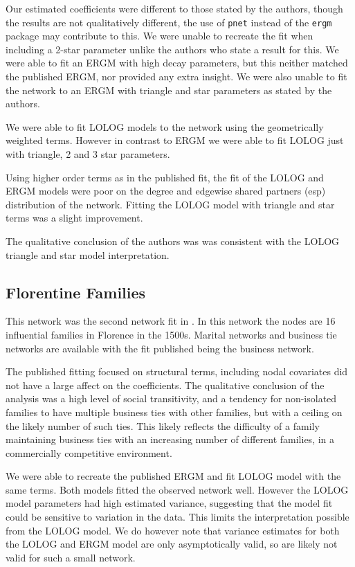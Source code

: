 \documentclass[
]{statsoc}
\begin{document}
Our estimated coefficients were different to those stated by the
authors, though the results are not qualitatively different, the use of
\texttt{pnet} instead of the \texttt{ergm} package may contribute to
this. We were unable to recreate the fit when including a 2-star
parameter unlike the authors who state a result for this. We were able
to fit an ERGM with high decay parameters, but this neither matched the
published ERGM, nor provided any extra insight. We were also unable to
fit the network to an ERGM with triangle and star parameters as stated
by the authors.

We were able to fit LOLOG models to the network using the geometrically
weighted terms. However in contrast to ERGM we were able to fit LOLOG
just with triangle, 2 and 3 star parameters.

Using higher order terms as in the published fit, the fit of the LOLOG
and ERGM models were poor on the degree and edgewise shared partners
(esp) distribution of the network. Fitting the LOLOG model with triangle
and star terms was a slight improvement.

The qualitative conclusion of the authors was was consistent with the
LOLOG triangle and star model interpretation.

\subsection{Florentine Families}

This network was the second network fit in \cite{Robins2007}. In this
network the nodes are 16 influential families in Florence in the 1500s.
Marital networks and business tie networks are available with the fit
published being the business network.

The published fitting focused on structural terms, including nodal
covariates did not have a large affect on the coefficients. The
qualitative conclusion of the analysis was a high level of social
transitivity, and a tendency for non-isolated families to have multiple
business ties with other families, but with a ceiling on the likely
number of such ties. This likely reflects the difficulty of a family
maintaining business ties with an increasing number of different
families, in a commercially competitive environment.

We were able to recreate the published ERGM and fit LOLOG model with the
same terms. Both models fitted the observed network well. However the
LOLOG model parameters had high estimated variance, suggesting that the
model fit could be sensitive to variation in the data. This limits the
interpretation possible from the LOLOG model. We do however note that
variance estimates for both the LOLOG and ERGM model are only
asymptotically valid, so are likely not valid for such a small network.
\end{document}
